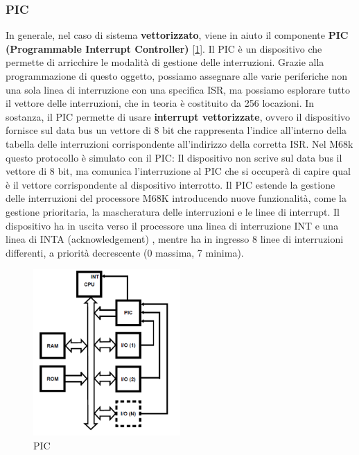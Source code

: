 \subsubsection{PIC} \label{par:PIC}
In generale, nel caso di sistema \textbf{vettorizzato}, viene in aiuto il componente \textbf{PIC (Programmable Interrupt Controller)} [\ref{img:PIC}].
Il PIC è un dispositivo che permette di arricchire le
modalità di gestione delle interruzioni. Grazie alla programmazione di questo oggetto, possiamo assegnare alle varie periferiche non una sola linea di interruzione con una specifica ISR, ma possiamo esplorare tutto il vettore delle interruzioni, che in teoria è costituito da 256 locazioni. In sostanza, il PIC permette di usare \textbf{interrupt vettorizzate}, ovvero il dispositivo fornisce sul data bus un vettore di 8 bit che rappresenta l’indice all’interno della tabella delle interruzioni corrispondente all’indirizzo della corretta ISR. Nel M68k questo protocollo è simulato con il PIC: Il dispositivo non scrive sul data bus il vettore di 8 bit, ma comunica l’interruzione al PIC che si occuperà di capire qual è il vettore corrispondente al dispositivo interrotto. Il PIC estende la gestione delle interruzioni del processore M68K introducendo nuove funzionalità, come la gestione prioritaria, la mascheratura delle interruzioni e le linee di interrupt. Il dispositivo ha in uscita verso il processore una linea di interruzione INT e una linea di INTA (acknowledgement) , mentre ha in ingresso 8 linee di interruzioni differenti, a priorità decrescente (0 massima, 7 minima).

\begin{figure} [ht]
    \centering
    \includegraphics[width=0.5\textwidth]{img/PIC3.png}
    \caption{PIC}\label{img:PIC}
\end{figure}


